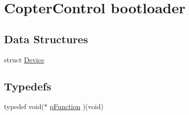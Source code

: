\hypertarget{group___copter_control_b_l}{\section{\-Copter\-Control bootloader}
\label{group___copter_control_b_l}
}
\subsection*{\-Data \-Structures}
\begin{DoxyCompactItemize}
\item 
struct \hyperlink{struct_device}{\-Device}
\end{DoxyCompactItemize}
\subsection*{\-Typedefs}
\begin{DoxyCompactItemize}
\item 
typedef void($\ast$ \hyperlink{group___copter_control_b_l_ga9227bf1f1a9c633a0cc9ca50cc761c1a}{p\-Function} )(void)
\end{DoxyCompactItemize}
